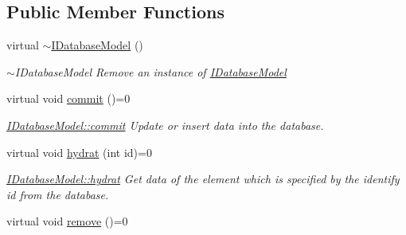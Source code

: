 \subsection*{Public Member Functions}
\begin{DoxyCompactItemize}
\item 
\hypertarget{classModels_1_1IDatabaseModel_a7dd56f574720919d1703651f5896141f}{virtual \hyperlink{classModels_1_1IDatabaseModel_a7dd56f574720919d1703651f5896141f}{$\sim$\+I\+Database\+Model} ()}\label{classModels_1_1IDatabaseModel_a7dd56f574720919d1703651f5896141f}

\begin{DoxyCompactList}\small\item\em $\sim$\+I\+Database\+Model Remove an instance of \hyperlink{classModels_1_1IDatabaseModel}{I\+Database\+Model} \end{DoxyCompactList}\item 
\hypertarget{classModels_1_1IDatabaseModel_a8fcb1587824753cd121a7d961b60a98a}{virtual void \hyperlink{classModels_1_1IDatabaseModel_a8fcb1587824753cd121a7d961b60a98a}{commit} ()=0}\label{classModels_1_1IDatabaseModel_a8fcb1587824753cd121a7d961b60a98a}

\begin{DoxyCompactList}\small\item\em \hyperlink{classModels_1_1IDatabaseModel_a8fcb1587824753cd121a7d961b60a98a}{I\+Database\+Model\+::commit} Update or insert data into the database. \end{DoxyCompactList}\item 
virtual void \hyperlink{classModels_1_1IDatabaseModel_af0814d81fc76a881bc64d9062adf1f6c}{hydrat} (int id)=0
\begin{DoxyCompactList}\small\item\em \hyperlink{classModels_1_1IDatabaseModel_af0814d81fc76a881bc64d9062adf1f6c}{I\+Database\+Model\+::hydrat} Get data of the element which is specified by the identify {\itshape id} from the database. \end{DoxyCompactList}\item 
\hypertarget{classModels_1_1IDatabaseModel_a6d8eca5b493b57c21feafae75c783b14}{virtual void \hyperlink{classModels_1_1IDatabaseModel_a6d8eca5b493b57c21feafae75c783b14}{remove} ()=0}\label{classModels_1_1IDatabaseModel_a6d8eca5b493b57c21feafae75c783b14}


\end{DoxyCompactItemize}
